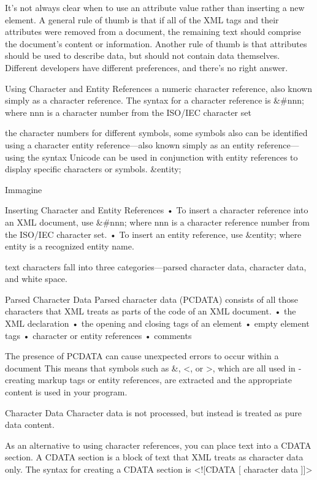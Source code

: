 It’s not always clear when to use an attribute value rather than inserting a new element.
A general rule of thumb is that if all of the XML tags and their attributes were
removed from a document, the remaining text should comprise the document’s content
or information.
Another rule of thumb is that attributes should be used to describe data, but should
not contain data themselves.
Different developers have different preferences, and
there’s no right answer.

Using Character and Entity References
a numeric character reference, also known simply as a ­character
reference. The syntax for a character reference is
&#nnn;
where nnn is a character number from the ISO/IEC character set

the character numbers for different symbols,
some symbols also can be identified using a character entity reference—also known
si­mply as an entity reference—using the syntax
Unicode can be used in
conjunction with entity
references to display
specific characters or
symbols.
&entity;

Immagine


Inserting Character and Entity References
• To insert a character reference into an XML document, use
&#nnn;
where nnn is a character reference number from the ISO/IEC character set.
• To insert an entity reference, use
&entity;
where entity is a recognized entity name.


text characters fall into three categories—parsed
character data, character data, and white space.


Parsed Character Data
Parsed character data (PCDATA) consists of all those characters that XML treats as parts
of the code of an XML document.
• the XML declaration
• the opening and closing tags of an element
• empty element tags
• character or entity references
• comments

The presence of PCDATA can cause unexpected errors to occur within a document
This means that symbols such as &, <, or >, which are all used in ­creating
markup tags or entity references, are extracted and the appropriate content is used in your
program.

Character Data
Character data is not processed,
but instead is treated as pure data content.

As an alternative to using character references, you can place text into a CDATA section.
A CDATA section is a block of text that XML treats as character data only. The syntax for
creating a CDATA section is
<![CDATA [
		character data
	]]>

